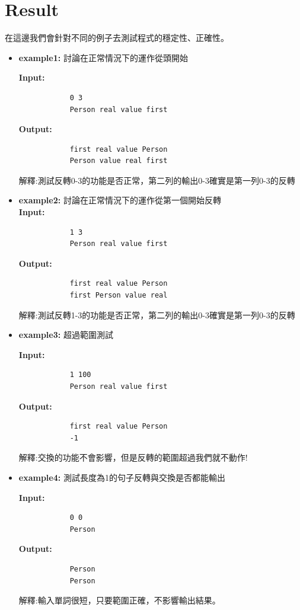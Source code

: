 \documentclass{article}
\begin{document}
	\section{Result}
	在這邊我們會針對不同的例子去測試程式的穩定性、正確性。
	\begin{itemize}
		\item \textbf{example1:} 討論在正常情況下的運作從頭開始
		
		\textbf{Input:}
		\begin{lstlisting}
			0 3
			Person real value first 
		\end{lstlisting}
		\textbf{Output:}
		\begin{lstlisting}
			first real value Person 
			Person value real first 					
		\end{lstlisting}
		解釋:測試反轉0-3的功能是否正常，第二列的輸出0-3確實是第一列0-3的反轉
		
		\item \textbf{example2:} 討論在正常情況下的運作從第一個開始反轉 \\
		\textbf{Input:}
		\begin{lstlisting}
			1 3
			Person real value first 			
		\end{lstlisting}
		\textbf{Output:}
		\begin{lstlisting}
			first real value Person 
			first Person value real 								
		\end{lstlisting}
		解釋:測試反轉1-3的功能是否正常，第二列的輸出0-3確實是第一列0-3的反轉
		
		\item \textbf{example3:} 超過範圍測試
		
		\textbf{Input:}
		\begin{lstlisting}
			1 100
			Person real value first 
		\end{lstlisting}
		\textbf{Output:}
		\begin{lstlisting}
			first real value Person 
			-1			
		\end{lstlisting}
		解釋:交換的功能不會影響，但是反轉的範圍超過我們就不動作!
		
		\item \textbf{example4:} 測試長度為1的句子反轉與交換是否都能輸出
		
		\textbf{Input:}
		\begin{lstlisting}
			0 0
			Person 
		\end{lstlisting}
		
		\textbf{Output:}
		\begin{lstlisting}
			Person 
			Person 				
		\end{lstlisting}
		解釋:輸入單詞很短，只要範圍正確，不影響輸出結果。
		
	\end{itemize}
	
\end{document}
